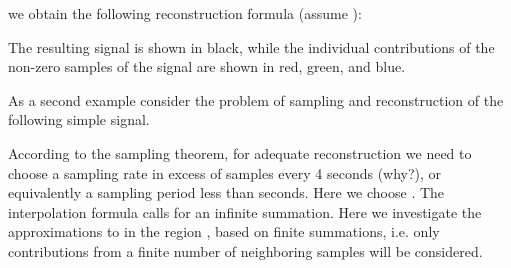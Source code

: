 \documentclass{article}
\begin{document}
\begin{CellGroup}
we obtain the following reconstruction formula  (assume ):



\begin{CellGroup}

\end{CellGroup}
The resulting signal is shown in black, while the individual contributions of the non-zero samples of the signal are shown in red, green, and blue.

As a second example consider the problem of sampling and reconstruction of the following simple signal.

\begin{CellGroup}

\end{CellGroup}
According to the sampling theorem, for adequate reconstruction we need to choose a sampling rate in excess of  samples every 4
seconds (why?), or equivalently a sampling period less than  seconds. Here we choose . The interpolation
formula calls for an infinite summation. Here we investigate the approximations to  in the region , based on finite summations, i.e. only contributions from a finite number of neighboring samples will be considered.




\end{CellGroup}
\end{document}
